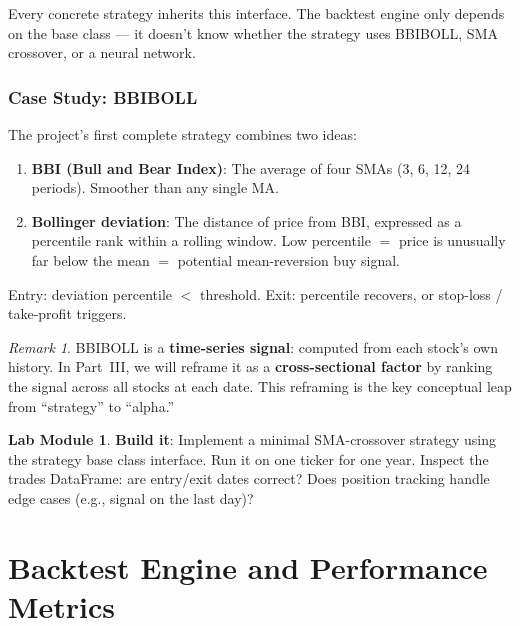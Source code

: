 \documentclass[a4paper, 11pt]{report}
\theoremstyle{definition}
\newtheorem{labmod}{Lab Module}[chapter]
\theoremstyle{remark}
\newtheorem{remark}{Remark}[chapter]
\begin{document}
Every concrete strategy inherits this interface.  The backtest engine only
depends on the base class --- it doesn't know whether the strategy uses BBIBOLL,
SMA crossover, or a neural network.

\subsection{Case Study: BBIBOLL}

The project's first complete strategy combines two ideas:

\begin{enumerate}
    \item \textbf{BBI (Bull and Bear Index)}: The average of four SMAs
          (3, 6, 12, 24 periods).  Smoother than any single MA.
    \item \textbf{Bollinger deviation}: The distance of price from BBI,
          expressed as a percentile rank within a rolling window.  Low
          percentile $=$ price is unusually far below the mean $=$ potential
          mean-reversion buy signal.
\end{enumerate}

Entry: deviation percentile $<$ threshold.  Exit: percentile recovers, or
stop-loss / take-profit triggers.

\begin{remark}
    BBIBOLL is a \textbf{time-series signal}: computed from each stock's own
    history.  In Part~III, we will reframe it as a \textbf{cross-sectional
    factor} by ranking the signal across all stocks at each date.  This
    reframing is the key conceptual leap from ``strategy'' to ``alpha.''
\end{remark}

\begin{labmod}
    \textbf{Build it}: Implement a minimal SMA-crossover strategy using
    the strategy base class interface.  Run it on one ticker for one year.
    Inspect the trades DataFrame: are entry/exit dates correct?  Does
    position tracking handle edge cases (e.g., signal on the last day)?
\end{labmod}


\chapter{Backtest Engine and Performance Metrics}
\label{ch:engine}

\end{document}
